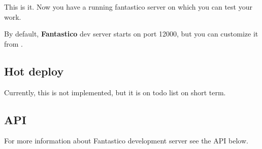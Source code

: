 \documentclass[letterpaper,10pt,english]{sphinxmanual}
\begin{document}
This is it. Now you have a running fantastico server on which you can test your work.

By default, \textbf{Fantastico} dev server starts on port 12000, but you can customize it from
{\hyperref[get_started/settings:fantastico.settings.BasicSettings]{}}.


\subsection{Hot deploy}
\label{get_started/dev_mode:hot-deploy}
Currently, this is not implemented, but it is on todo list on short term.


\subsection{API}
\label{get_started/dev_mode:api}
For more information about Fantastico development server see the API below.
\end{document}
